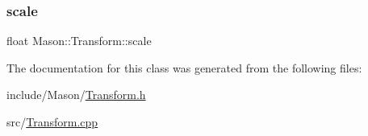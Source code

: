 \subsubsection{\texorpdfstring{scale}{scale}}
{\footnotesize\ttfamily float Mason\+::\+Transform\+::scale\hspace{0.3cm}{\ttfamily [protected]}}



The documentation for this class was generated from the following files\+:\begin{DoxyCompactItemize}
\item 
include/\+Mason/\hyperlink{_transform_8h}{Transform.\+h}\item 
src/\hyperlink{_transform_8cpp}{Transform.\+cpp}\end{DoxyCompactItemize}
